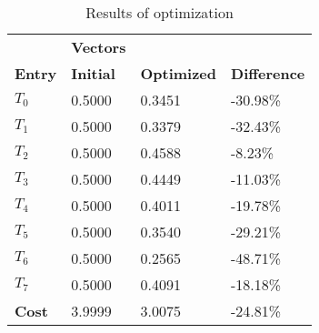 \begin{table}[h!]
\centering
\begin{tabular}{llll}
\textbf{}      & \cellcolor[HTML]{EFEFEF}\textbf{Vectors} & \textbf{} & \textbf{}         \\
\rowcolor[HTML]{EFEFEF} 
\textbf{Entry} & \textbf{Initial} & \textbf{Optimized} & \textbf{Difference} \\
$T_0$ & 0.5000 & 0.3451 & -30.98\% \\ 
$T_1$ & 0.5000 & 0.3379 & -32.43\% \\ 
$T_2$ & 0.5000 & 0.4588 & -8.23\% \\ 
$T_3$ & 0.5000 & 0.4449 & -11.03\% \\ 
$T_4$ & 0.5000 & 0.4011 & -19.78\% \\ 
$T_5$ & 0.5000 & 0.3540 & -29.21\% \\ 
$T_6$ & 0.5000 & 0.2565 & -48.71\% \\ 
$T_7$ & 0.5000 & 0.4091 & -18.18\% \\ 
\rowcolor[HTML]{EFEFEF} 
\textbf{Cost}  & 3.9999 & 3.0075 & -24.81\% \\ 
\end{tabular}
\caption{Results of optimization}
\label{tab:OptimizationAnalysis}
\end{table}